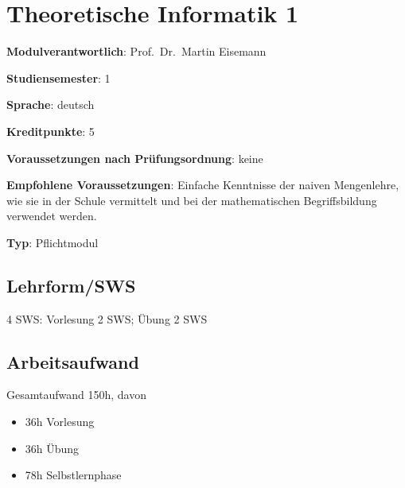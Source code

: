 \chapter{Theoretische Informatik
1\label{/mi-2017/modulbeschreibungen-bachelor/BA_TheoretischeInformatik1}}\label{theoretische-informatik-1pathlabelmi-2017modulbeschreibungen-bachelorbaux5ftheoretischeinformatik1}

\begin{modulHead}
\textbf{Modulverantwortlich}: Prof.~Dr.~Martin
Eisemann
\end{modulHead}
\begin{modulHead}
\textbf{Studiensemester}:
1
\end{modulHead}
\begin{modulHead}
\textbf{Sprache}:
deutsch
\end{modulHead}
\begin{modulHead}
\textbf{Kreditpunkte}:
5
\end{modulHead}
\begin{modulHead}
\textbf{Voraussetzungen nach
Prüfungsordnung}:
keine
\end{modulHead}
\begin{modulHead}
\textbf{Empfohlene
Voraussetzungen}: Einfache Kenntnisse der naiven Mengenlehre, wie sie in
der Schule vermittelt und bei der mathematischen Begriffsbildung
verwendet werden.
\end{modulHead}
\begin{modulHead}
\textbf{Typ}:
Pflichtmodul
\end{modulHead}


\section*{Lehrform/SWS\label{/mi-2017/modulbeschreibungen-bachelor/BA_TheoretischeInformatik1}}\label{lehrformswspathlabelmi-2017modulbeschreibungen-bachelorbaux5ftheoretischeinformatik1}

4 SWS: Vorlesung 2 SWS; Übung 2 SWS

\section*{Arbeitsaufwand\label{/mi-2017/modulbeschreibungen-bachelor/BA_TheoretischeInformatik1}}\label{arbeitsaufwandpathlabelmi-2017modulbeschreibungen-bachelorbaux5ftheoretischeinformatik1}

Gesamtaufwand 150h, davon

\begin{itemize}
\tightlist
\item
  36h Vorlesung
\item
  36h Übung
\item
  78h Selbstlernphase
\end{itemize}

